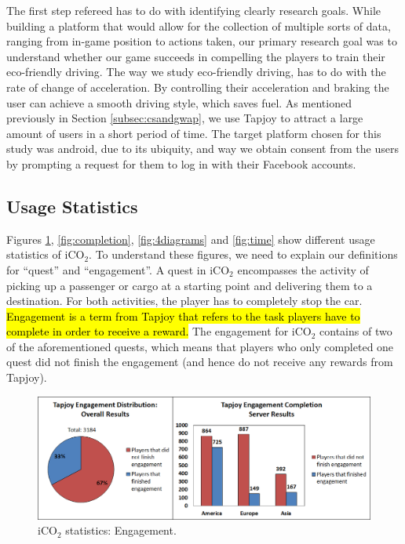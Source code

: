 \documentclass[preprint,authoryear,12pt]{elsarticle}
\newcommand{\hlc}[2][yellow]{ {\sethlcolor{#1} \hl{#2}} }
\begin{document}
The first step refereed has to do with identifying clearly research goals. While building a platform that would allow for the collection of multiple sorts of data, ranging from in-game position to actions taken, our primary research goal was to understand whether our game succeeds in compelling the players to train their eco-friendly driving.
The way we study eco-friendly driving, has to do with the rate of change of acceleration. By controlling their acceleration and braking the user can achieve a smooth driving style, which saves fuel.
As mentioned previously in Section \ref{subsec:csandgwap}, we use Tapjoy to attract a large amount of users in a short period of time.
The target platform chosen for this study was android, due to its ubiquity, and way we obtain consent from the users by prompting a request for them to log in with their Facebook accounts. 




\subsection{Usage Statistics}
\label{subsec:usage_stats}

Figures \ref{fig:engagement}, \ref{fig:completion}, \ref{fig:4diagrams} and \ref{fig:time} show different usage statistics of iCO$_2$. To understand these figures, we need to explain our definitions for ``quest'' and ``engagement''. A quest in iCO$_2$ encompasses the activity of picking up a passenger or cargo at a starting point and delivering them to a destination. For both activities, the player has to completely stop the car. 
\hlc[green]{Engagement is a term from Tapjoy that refers to the task players have to complete in order to receive a reward.} The engagement for iCO$_2$ contains of two of the aforementioned quests, which means that players who only completed one quest did not finish the engagement (and hence do not receive any rewards from Tapjoy).

\begin{figure}[htb]
	\begin{center}
		\includegraphics[width=.95\linewidth]{ijhcs14-img/engagement}
		\caption{iCO$_2$ statistics: Engagement.\label{fig:engagement}}
	\end{center}
\end{figure}
\end{document}

